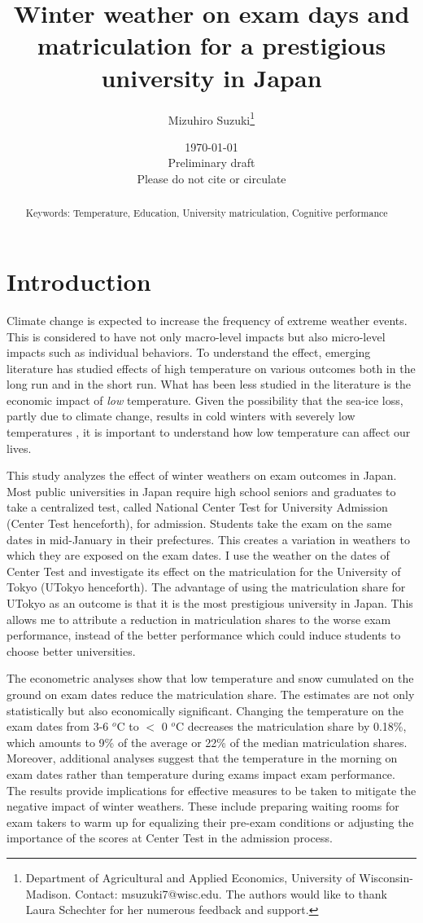 \documentclass[12pt,letterpaper]{article}
\title{Winter weather on exam days and matriculation for a prestigious university in Japan}%
\author{Mizuhiro Suzuki\thanks{Department of Agricultural and Applied Economics, University of Wisconsin-Madison. Contact: msuzuki7@wisc.edu. The authors would like to thank Laura Schechter for her numerous feedback and support.}}
\date{\today \\ \vspace{1cm} Preliminary draft \\ Please do not cite or circulate}
\begin{document}
  
\maketitle
\begin{abstract}
  \singlespacing
     \noindent 
  
  \medskip
  \vspace{1cm}
 \noindent Keywords: Temperature, Education, University matriculation, Cognitive performance
\end{abstract}

\newpage

\section{Introduction}

Climate change is expected to increase the frequency of extreme weather events.
This is considered to have not only macro-level impacts but also micro-level impacts such as individual behaviors.
To understand the effect, emerging literature has studied effects of high temperature on various outcomes both in the long run and in the short run.
What has been less studied in the literature is the economic impact of \textit{low} temperature.
Given the possibility that the sea-ice loss, partly due to climate change, results in cold winters with severely low temperatures \citep{Kretschmer2016, Kim2014}, it is important to understand how low temperature can affect our lives.

This study analyzes the effect of winter weathers on exam outcomes in Japan.
Most public universities in Japan require high school seniors and graduates to take a centralized test, called National Center Test for University Admission (Center Test henceforth), for admission.
Students take the exam on the same dates in mid-January in their prefectures.
This creates a variation in weathers to which they are exposed on the exam dates.
I use the weather on the dates of Center Test and investigate its effect on the matriculation for the University of Tokyo (UTokyo henceforth).
The advantage of using the matriculation share for UTokyo as an outcome is that it is the most prestigious university in Japan.
This allows me to attribute a reduction in matriculation shares to the worse exam performance, instead of the better performance which could induce students to choose better universities.

The econometric analyses show that low temperature and snow cumulated on the ground on exam dates reduce the matriculation share.
The estimates are not only statistically but also economically significant.
Changing the temperature on the exam dates from 3-6 $^o$C to $<$ 0 $^o$C decreases the matriculation share by 0.18\%, which amounts to 9\% of the average or 22\% of the median matriculation shares.
Moreover, additional analyses suggest that the temperature in the morning on exam dates rather than temperature during exams impact exam performance. 
The results provide implications for effective measures to be taken to mitigate the negative impact of winter weathers.
These include preparing waiting rooms for exam takers to warm up for equalizing their pre-exam conditions or adjusting the importance of the scores at Center Test in the admission process.
\end{document}
